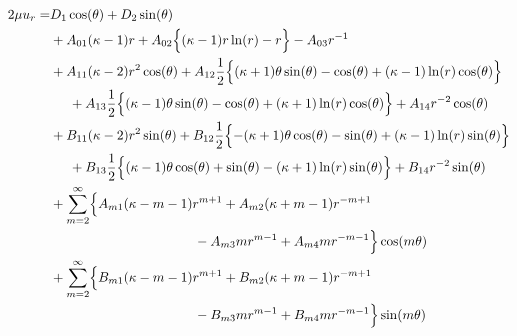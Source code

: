 \begin{align}
	2\mu u_{r} =&D_{1}\cos(\theta)+D_{2}\sin(\theta)
	\nonumber
	\\
	&+A_{01}(\kappa-1)r
	+A_{02}\Bigl\{ (\kappa-1)r\ln(r)-r\Bigr\}
	-A_{03}r^{-1}
	\nonumber
	\\
	&+A_{11}(\kappa-2)r^2\cos(\theta)
	+A_{12}\frac{1}{2}\Bigl\{ (\kappa+1)\theta\sin(\theta) -\cos(\theta)+(\kappa-1)\ln(r)\cos(\theta) \Bigr\}
	\nonumber
	\\
	&\hspace{0.5cm}+A_{13}\frac{1}{2}\Bigl\{ (\kappa-1)\theta\sin(\theta) -\cos(\theta)+(\kappa+1)\ln(r)\cos(\theta) \Bigr\}
	+A_{14}r^{-2}\cos(\theta)
	\nonumber
	\\
	&+B_{11}(\kappa-2)r^2\sin(\theta)
	+B_{12}\frac{1}{2}\Bigl\{ -(\kappa+1)\theta\cos(\theta) -\sin(\theta)+(\kappa-1)\ln(r)\sin(\theta) \Bigr\}
	\nonumber
	\\
	&\hspace{0.5cm}+B_{13}\frac{1}{2}\Bigl\{ (\kappa-1)\theta\cos(\theta) +\sin(\theta)-(\kappa+1)\ln(r)\sin(\theta) \Bigr\}
	+B_{14}r^{-2}\sin(\theta)
	\nonumber
	\\
	&+\sum_{m=2}^{\infty}\Bigl\{A_{m1}(\kappa-m-1)r^{m+1}
	+A_{m2}(\kappa+m-1)r^{-m+1}
	\nonumber
	\\
	&\hspace{3.8cm}
	-A_{m3}mr^{m-1}
	+A_{m4}mr^{-m-1}\Bigr\}\cos(m\theta)
	\nonumber
	\\
	&+\sum_{m=2}^{\infty}\Bigl\{B_{m1}(\kappa-m-1)r^{m+1}
	+B_{m2}(\kappa+m-1)r^{-m+1}
	\nonumber
	\\
	&\hspace{3.8cm}
	-B_{m3}mr^{m-1}
	+B_{m4}mr^{-m-1}\Bigr\}\sin(m\theta)
	\label{eq:UR}
\end{align}
